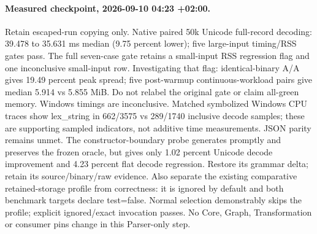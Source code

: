 \documentclass[11pt,a4paper]{article}
\begin{document}
\paragraph{Measured checkpoint, 2026-09-10 04:23 +02:00.}
Retain escaped-run copying only. Native paired 50k Unicode full-record decoding:
39.478 to 35.631 ms median (9.75 percent lower); five large-input timing/RSS gates
pass. The full seven-case gate retains a small-input RSS regression flag and one
inconclusive small-input row. Investigating that flag: identical-binary A/A gives
19.49 percent peak spread; five post-warmup continuous-workload pairs give median
5.914 vs 5.855 MiB. Do not relabel the original gate or claim all-green memory.
Windows timings are inconclusive. Matched symbolized Windows CPU traces show
lex\_string in 662/3575 vs 289/1740 inclusive decode samples; these are supporting
sampled indicators, not additive time measurements. JSON parity remains unmet.
The constructor-boundary probe generates promptly and preserves the frozen oracle,
but gives only 1.02 percent Unicode decode improvement and 4.23 percent flat decode
regression. Restore its grammar delta; retain its source/binary/raw evidence.
Also separate the existing comparative retained-storage profile from correctness:
it is ignored by default and both benchmark targets declare test=false. Normal
selection demonstrably skips the profile; explicit ignored/exact invocation passes.
No Core, Graph, Transformation or consumer pins change in this Parser-only step.
\end{document}
